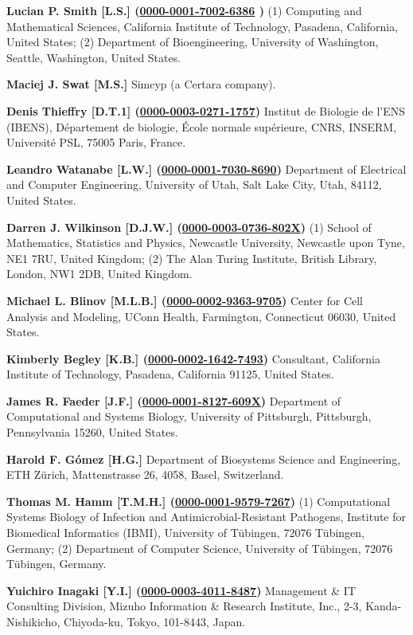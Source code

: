 \documentclass{sbml-paper}
\newcommand{\orcid}[1]{\href{https://orcid.org/#1}{#1}}
\begin{document}
\textbf{Lucian P. Smith [L.S.] (\orcid{0000-0001-7002-6386} )} (1) Computing and Mathematical Sciences, California Institute of Technology, Pasadena, California, United States; (2) Department of Bioengineering, University of Washington, Seattle, Washington, United States.

\textbf{Maciej J. Swat [M.S.]} Simcyp (a Certara company).

\textbf{Denis Thieffry [D.T.1] (\orcid{0000-0003-0271-1757})} Institut de Biologie de l'ENS (IBENS), Département de biologie, École normale supérieure, CNRS, INSERM, Université PSL, 75005 Paris, France.

\textbf{Leandro Watanabe [L.W.] (\orcid{0000-0001-7030-8690})} Department of Electrical and Computer Engineering,  University of Utah, Salt Lake City, Utah, 84112, United States.

\textbf{Darren J. Wilkinson [D.J.W.] (\orcid{0000-0003-0736-802X})} (1) School of Mathematics, Statistics and Physics, Newcastle University, Newcastle upon Tyne, NE1 7RU, United Kingdom; (2) The Alan Turing Institute, British Library, London, NW1 2DB, United Kingdom.

\textbf{Michael L. Blinov [M.L.B.] (\orcid{0000-0002-9363-9705})} Center for Cell Analysis and Modeling, UConn Health, Farmington, Connecticut 06030, United States.

\textbf{Kimberly Begley [K.B.] (\orcid{0000-0002-1642-7493})} Consultant, California Institute of Technology, Pasadena, California 91125, United States.

\textbf{James R. Faeder [J.F.] (\orcid{0000-0001-8127-609X})} Department of Computational and Systems Biology, University of Pittsburgh, Pittsburgh, Pennsylvania 15260, United States.

\textbf{Harold F. Gómez [H.G.]} Department of Biosystems Science and Engineering, ETH Zürich, Mattenstrasse 26, 4058, Basel, Switzerland.

\textbf{Thomas M. Hamm [T.M.H.] (\orcid{0000-0001-9579-7267})} (1) Computational Systems Biology of Infection and Antimicrobial-Resistant Pathogens, Institute for Biomedical Informatics (IBMI), University of Tübingen, 72076 Tübingen, Germany; (2) Department of Computer Science, University of Tübingen, 72076 Tübingen, Germany.

\textbf{Yuichiro Inagaki [Y.I.] (\orcid{0000-0003-4011-8487})} Management \& IT Consulting Division, Mizuho Information \& Research Institute, Inc., 2-3, Kanda-Nishikicho, Chiyoda-ku, Tokyo, 101-8443, Japan.
\end{document}
